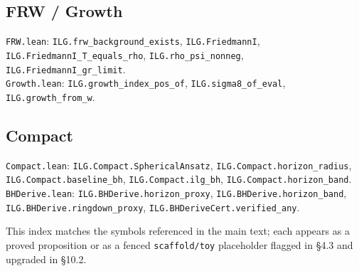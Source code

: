 \documentclass[12pt,a4paper]{article}
\begin{document}
\subsection*{FRW / Growth}
\noindent\texttt{FRW.lean}: \texttt{ILG.frw\_background\_exists}, \texttt{ILG.FriedmannI}, \texttt{ILG.FriedmannI\_T\_equals\_rho}, \texttt{ILG.rho\_psi\_nonneg}, \texttt{ILG.FriedmannI\_gr\_limit}.\\
\noindent\texttt{Growth.lean}: \texttt{ILG.growth\_index\_pos\_of}, \texttt{ILG.sigma8\_of\_eval}, \texttt{ILG.growth\_from\_w}.

\subsection*{Compact}
\noindent\texttt{Compact.lean}: \texttt{ILG.Compact.SphericalAnsatz}, \texttt{ILG.Compact.horizon\_radius}, \texttt{ILG.Compact.baseline\_bh}, \texttt{ILG.Compact.ilg\_bh}, \texttt{ILG.Compact.horizon\_band}.\\
\noindent\texttt{BHDerive.lean}: \texttt{ILG.BHDerive.horizon\_proxy}, \texttt{ILG.BHDerive.horizon\_band}, \texttt{ILG.BHDerive.ringdown\_proxy}, \texttt{ILG.BHDeriveCert.verified\_any}.

\medskip
\noindent This index matches the symbols referenced in the main text; each appears as a proved proposition or as a fenced \texttt{scaffold/toy} placeholder flagged in §4.3 and upgraded in §10.2.
\end{document}
